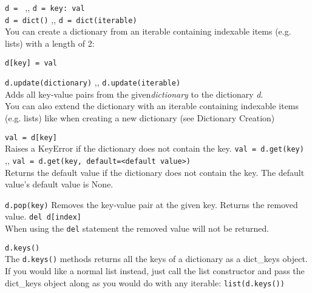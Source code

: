    \begin{itemize}
         \texttt{d = {}} \sep{,} \texttt{d = {key: val}} \\
        \texttt{d = dict()} \sep{,} \texttt{d = dict(iterable)} \\
        You can create a dictionary from an iterable containing indexable items (e.g. lists)
        with a length of 2:


         \texttt{d[key] = val}

         \texttt{d.update(dictionary)} \sep{,}
        \texttt{d.update(iterable)} \\
        Adds all key-value pairs from the given\textit{dictionary} to the dictionary \textit{d}.\\
        You can also extend the dictionary with an iterable containing indexable items (e.g. lists)
        like when creating a new dictionary (see Dictionary Creation)

        \begin{itemize}
             \texttt{val = d[key]} \\
            Raises a KeyError if the dictionary does not contain the key.
             \texttt{val = d.get(key)} \sep{,}
            \texttt{val = d.get(key, default=<default value>)} \\
            Returns the default value if the dictionary does not contain the key.
            The default value's default value is None.
        \end{itemize}

        \begin{itemize}
             \texttt{d.pop(key)}
            Removes the key-value pair at the given key. Returns the removed value.
             \texttt{del d[index]} \\
            When using the \texttt{del} statement the removed value will not be
            returned.
        \end{itemize}
        
         \texttt{d.keys()} \\
        The \texttt{d.keys()} methods returns all the keys of a dictionary as a
        dict\_keys
        object. If you would like a normal list instead, just call the list constructor and pass the
        dict\_keys object along as you would do with any iterable:
        \texttt{list(d.keys())}
        

\end{itemize}
